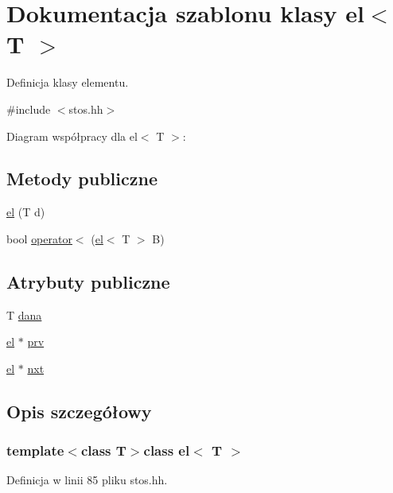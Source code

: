 \hypertarget{classel}{\section{\-Dokumentacja szablonu klasy el$<$ \-T $>$}
\label{classel}
}


\-Definicja klasy elementu.  




{\ttfamily \#include $<$stos.\-hh$>$}



\-Diagram współpracy dla el$<$ \-T $>$\-:
\subsection*{\-Metody publiczne}
\begin{DoxyCompactItemize}
\item 
\hyperlink{classel_aa3e5b1b1e8674023f92ad9694c41ae2b}{el} (\-T d)
\item 
bool \hyperlink{classel_a4b262fcbc2545d96a48dc14ac0e69e99}{operator$<$} (\hyperlink{classel}{el}$<$ \-T $>$ \-B)
\end{DoxyCompactItemize}
\subsection*{\-Atrybuty publiczne}
\begin{DoxyCompactItemize}
\item 
\-T \hyperlink{classel_aced2827a8e030b5b9d5f857b8f202582}{dana}
\item 
\hyperlink{classel}{el} $\ast$ \hyperlink{classel_a69d8939dbcd5c7fbb8467263f7000696}{prv}
\item 
\hyperlink{classel}{el} $\ast$ \hyperlink{classel_aa1eac5dfc1ae72aa97ac92db49b4bc05}{nxt}
\end{DoxyCompactItemize}


\subsection{\-Opis szczegółowy}
\subsubsection*{template$<$class \-T$>$class el$<$ T $>$}



\-Definicja w linii 85 pliku stos.\-hh.



